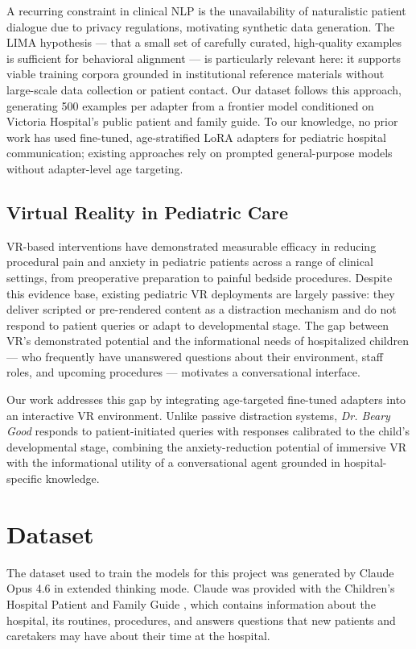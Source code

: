 \documentclass[journal]{IEEEtai}
\begin{document}
A recurring constraint in clinical NLP is the unavailability of naturalistic patient dialogue due to privacy regulations, motivating synthetic data generation. The LIMA hypothesis \cite{zhou2023lima} --- that a small set of carefully curated, high-quality examples is sufficient for behavioral alignment --- is particularly relevant here: it supports viable training corpora grounded in institutional reference materials without large-scale data collection or patient contact. Our dataset follows this approach, generating 500 examples per adapter from a frontier model conditioned on Victoria Hospital's public patient and family guide. To our knowledge, no prior work has used fine-tuned, age-stratified LoRA adapters for pediatric hospital communication; existing approaches rely on prompted general-purpose models without adapter-level age targeting.

\subsection{Virtual Reality in Pediatric Care}

VR-based interventions have demonstrated measurable efficacy in reducing procedural pain and anxiety in pediatric patients across a range of clinical settings, from preoperative preparation to painful bedside procedures. Despite this evidence base, existing pediatric VR deployments are largely passive: they deliver scripted or pre-rendered content as a distraction mechanism and do not respond to patient queries or adapt to developmental stage. The gap between VR's demonstrated potential and the informational needs of hospitalized children --- who frequently have unanswered questions about their environment, staff roles, and upcoming procedures --- motivates a conversational interface.

Our work addresses this gap by integrating age-targeted fine-tuned adapters into an interactive VR environment. Unlike passive distraction systems, \textit{Dr. Beary Good} responds to patient-initiated queries with responses calibrated to the child's developmental stage, combining the anxiety-reduction potential of immersive VR with the informational utility of a conversational agent grounded in hospital-specific knowledge.

\section{Dataset}
The dataset used to train the models for this project was generated by Claude Opus 4.6 in extended thinking mode. Claude was provided with the Children's Hospital Patient and Family Guide \cite{hospitalguide}, which contains information about the hospital, its routines, procedures, and answers questions that new patients and caretakers may have about their time at the hospital.
\end{document}
